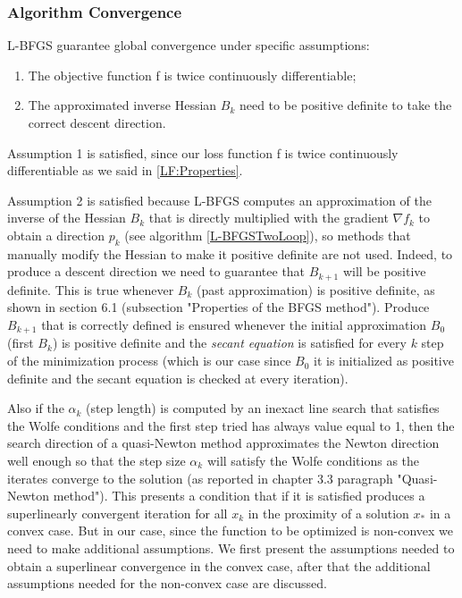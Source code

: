 \subsubsection{Algorithm Convergence}
\label{L-BFGSConv}
L-BFGS guarantee global convergence under specific assumptions:
\begin{enumerate} \label{convergence:assumption}
	\item The objective function f is twice continuously differentiable;
	\item The approximated inverse Hessian $B_{k}$ need to be positive definite to take the correct descent direction.
\end{enumerate}


Assumption 1 is satisfied, since our loss function f is twice continuously differentiable as we said in \ref{LF:Properties}. 
                                                       
Assumption 2 is satisfied because L-BFGS computes an approximation of the inverse of the Hessian $B_{k}$ that is directly multiplied with the gradient $\nabla f_{k}$ to obtain a direction $p_{k}$ (see algorithm \ref{L-BFGSTwoLoop}), so methods that manually modify the Hessian to make it positive definite are not used. Indeed, to produce a descent direction we need to guarantee that $B_{k+1}$  will be positive definite. This is true whenever $B_{k}$ (past approximation) is positive definite, as shown in \cite{numerical} section 6.1 (subsection "Properties of the BFGS method"). Produce $B_{k+1}$ that is correctly defined is ensured whenever the initial approximation $B_{0}$ (first $B_{k}$) is positive definite and the \textit{secant equation} is satisfied for every $k$ step of the minimization process (which is our case since $B_{0}$ it is initialized as positive definite and the secant equation is checked at every iteration). 

Also if the $\alpha_{k}$ (step length) is computed by an inexact line search that satisfies the Wolfe conditions and the first step tried has always value equal to 1, then the search direction of a quasi-Newton method approximates the Newton direction well enough so that the step size $\alpha_{k}$ will satisfy the Wolfe conditions as the iterates converge to the solution (as reported in \cite{numerical} chapter 3.3 paragraph "Quasi-Newton method"). This presents a condition that if it is satisfied produces a superlinearly convergent iteration for all $x_{k}$ in the proximity of a solution $x_{*}$ in a convex case. But in our case, since the function to be optimized is non-convex we need to make additional assumptions. We first present the assumptions needed to obtain a superlinear convergence in the convex case, after that the additional assumptions needed for the non-convex case are discussed.

